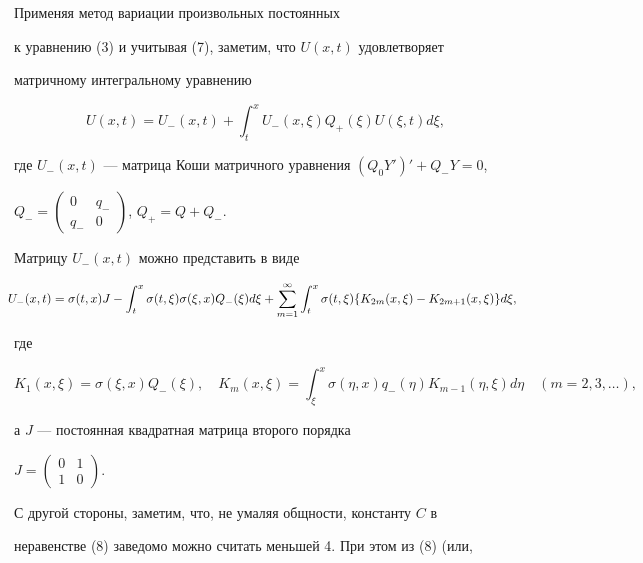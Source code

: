 \begin{pf} 


Применяя метод вариации произвольных постоянных 


к уравнению (3) и учитывая (7), заметим, что $U(x,t)$ удовлетворяет 


матричному интегральному уравнению 


\begin{equation} 


U(x,t)=U_-(x,t)+\int^x_t U_-(x,\xi) 


Q_+(\xi)U(\xi,t)d\xi,


\end{equation} 


где $U_-(x,t)$ --- матрица Коши матричного уравнения $(Q_0Y')'+Q_-Y=0$, 


$Q_-=\begin{pmatrix} 0 & q_- \\ q_- & 0 \end{pmatrix}$, $Q_+=Q+Q_-$. 


Матрицу $U_-(x,t)$ можно представить в виде 


\begin{equation} 


\hspace{-2mm}U_-(x,t)=\sigma(t,x)J-\int^x_t\sigma(t,\xi) 


\sigma(\xi,x)Q_-(\xi)d\xi+\sum^\infty_{m=1}\int^x_t 


\sigma(t,\xi)\{K_{2m}(x,\xi)-K_{2m+1}(x,\xi)\}d\xi, 


\end{equation} 


где 


$$ 


K_1(x,\xi)=\sigma(\xi,x)Q_-(\xi),\quad 


K_m(x,\xi)=\int^x_\xi \sigma(\eta,x)q_-(\eta) 


K_{m-1}(\eta,\xi)d\eta\quad (m=2,3,\dotsc), 


$$ 


а $J$ --- постоянная квадратная матрица второго порядка 


$J=\begin{pmatrix} 0 & 1 \\ 1 & 0 \end{pmatrix}$. 


С другой стороны, заметим, что, не умаляя общности, константу $C$ в 


неравенстве (8) заведомо можно считать меньшей 4. При этом из (8) (или, 



\end{pf}
